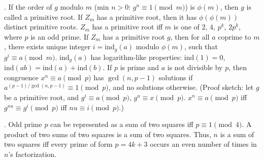 .  If the order of $g$ modulo $m$ (min $n>0$:
$g^n \equiv 1 \pmod{m}$) is $\phi(m)$, then $g$ is called a primitive root.
If $Z_m$ has a primitive root, then it has $\phi(\phi(m))$ distinct primitive
roots. $Z_m$ has a primitive root iff $m$ is one of $2$, $4$,
$p^k$, $2p^k$, where $p$ is an odd prime.
If $Z_m$ has a primitive root $g$, then for all $a$ coprime to $m$,
there exists unique integer $i=\text{ind}_g(a)$ modulo $\phi(m)$,
such that $g^i \equiv a \pmod{m}$.
$\text{ind}_g(a)$ has logarithm-like properties:
$\text{ind}(1) = 0$, $\text{ind}(ab) = \text{ind}(a) + \text{ind}(b)$.
If $p$ is prime and $a$ is not divisible by $p$, then congruence
$x^n \equiv a \pmod{p}$ has $\gcd(n, p-1)$ solutions if
$a^{(p-1)/\gcd(n,p-1)} \equiv 1 \pmod{p}$, and no solutions otherwise.
(Proof sketch: let $g$ be a primitive root, and
$g^i \equiv a \pmod{p}$, $g^u \equiv x \pmod{p}$.
$x^n \equiv a \pmod{p}$ iff $g^{nu} \equiv g^i \pmod{p}$ iff $nu \equiv i \pmod{p}$.)

.  Odd prime $p$ can be represented
as a sum of two squares iff $p \equiv 1 {\pmod 4}$.
A product of two sums of two squares is a sum of two squares.
Thus, $n$ is a sum of two squares iff every prime of
form $p=4k+3$ occurs an even number of times in $n$'s factorization.
 